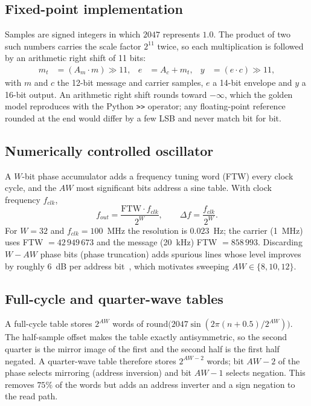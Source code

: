 \documentclass[conference]{IEEEtran}
\begin{document}
\subsection{Fixed-point implementation}
Samples are signed integers in which $2047$ represents $1.0$. The product of two
such numbers carries the scale factor $2^{11}$ twice, so each multiplication is
followed by an arithmetic right shift of 11 bits:
\begin{align}
m_t &= (A_m\cdot m)\gg 11, & e &= A_c + m_t, & y &= (e\cdot c)\gg 11,
\label{eq:fixed}
\end{align}
with $m$ and $c$ the 12-bit message and carrier samples, $e$ a 14-bit envelope
and $y$ a 16-bit output. An arithmetic right shift rounds toward $-\infty$, which
the golden model reproduces with the Python \texttt{>>} operator; any floating-point
reference rounded at the end would differ by a few LSB and never match bit for bit.

\subsection{Numerically controlled oscillator}
A $W$-bit phase accumulator adds a frequency tuning word (FTW) every clock cycle,
and the $AW$ most significant bits address a sine table. With clock frequency
$f_{clk}$,
\begin{equation}
f_{out}=\frac{\mathrm{FTW}\cdot f_{clk}}{2^{W}},\qquad
\Delta f=\frac{f_{clk}}{2^{W}}.
\label{eq:nco}
\end{equation}
For $W=32$ and $f_{clk}=100$~MHz the resolution is $0.023$~Hz; the carrier
(1~MHz) uses FTW $=42\,949\,673$ and the message (20~kHz) FTW $=858\,993$.
Discarding $W-AW$ phase bits (phase truncation) adds spurious lines whose level
improves by roughly 6~dB per address bit~\cite{nicholas1987}, which motivates
sweeping $AW\in\{8,10,12\}$.

\subsection{Full-cycle and quarter-wave tables}
A full-cycle table stores $2^{AW}$ words of
$\mathrm{round}\bigl(2047\sin(2\pi(n+0.5)/2^{AW})\bigr)$. The half-sample offset makes
the table exactly antisymmetric, so the second quarter is the mirror image of
the first and the second half is the first half negated. A quarter-wave table
therefore stores $2^{AW-2}$ words; bit $AW-2$ of the phase selects mirroring
(address inversion) and bit $AW-1$ selects negation. This removes $75\%$ of the
words but adds an address inverter and a sign negation to the read path.
\end{document}
